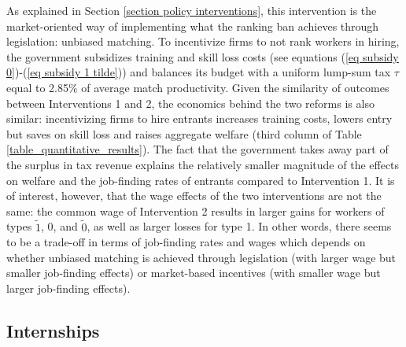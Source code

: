 \documentclass[12pt]{article} %
\theoremstyle{definition}
\begin{document}
As explained in Section \ref{section policy interventions}, this intervention is the market-oriented way of implementing what the ranking ban achieves through legislation: unbiased matching.
To incentivize firms to not rank workers in hiring, the government subsidizes training and skill loss costs (see equations (\ref{eq subsidy 0})-(\ref{eq subsidy 1 tilde})) and balances its budget with a uniform lump-sum tax $\tau$ equal to 2.85\% of average match productivity.  
Given the similarity of outcomes between Interventions 1 and 2, the economics behind the two reforms is also similar: incentivizing firms to hire entrants increases training costs, lowers entry but saves on skill loss and raises aggregate welfare (third column of Table \ref{table_quantitative_results}).
The fact that the government takes away part of the surplus in tax revenue explains the relatively smaller magnitude of the effects on welfare and the job-finding rates of entrants compared to Intervention 1.
It is of interest, however, that the wage effects of the two interventions are not the same: the common wage of Intervention 2 results in larger gains for workers of types $\tilde{1}$, 0, and $\tilde{0}$, as well as larger losses for type 1.
In other words, there seems to be a trade-off in terms of job-finding rates and wages which depends on whether unbiased matching is achieved through legislation (with larger wage but smaller job-finding effects) or market-based incentives (with smaller wage but larger job-finding effects).



\subsection{Internships} \label{section internships quant}
\end{document}
